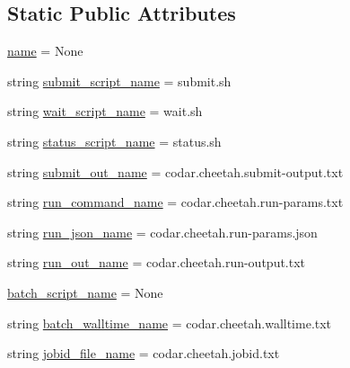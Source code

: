\subsection*{Static Public Attributes}
\begin{DoxyCompactItemize}
\item 
\hyperlink{classcodar_1_1cheetah_1_1launchers_1_1_launcher_aafbd307fbd2b8605a6e26bfda6e4cebe}{name} = None
\item 
string \hyperlink{classcodar_1_1cheetah_1_1launchers_1_1_launcher_ad49a82359a5f1fb129b34133e1068e92}{submit\+\_\+script\+\_\+name} = \textquotesingle{}submit.\+sh\textquotesingle{}
\item 
string \hyperlink{classcodar_1_1cheetah_1_1launchers_1_1_launcher_ab98a74ab3f9677e140eff974e94f6937}{wait\+\_\+script\+\_\+name} = \textquotesingle{}wait.\+sh\textquotesingle{}
\item 
string \hyperlink{classcodar_1_1cheetah_1_1launchers_1_1_launcher_ac3f6ab253b5fc5783e7b489da303a7d6}{status\+\_\+script\+\_\+name} = \textquotesingle{}status.\+sh\textquotesingle{}
\item 
string \hyperlink{classcodar_1_1cheetah_1_1launchers_1_1_launcher_aa4bbb4d58ed4af3a90c81b715bb32c90}{submit\+\_\+out\+\_\+name} = \textquotesingle{}codar.\+cheetah.\+submit-\/output.\+txt\textquotesingle{}
\item 
string \hyperlink{classcodar_1_1cheetah_1_1launchers_1_1_launcher_ad7f51985a666c18fa6b7944b8c09183e}{run\+\_\+command\+\_\+name} = \textquotesingle{}codar.\+cheetah.\+run-\/params.\+txt\textquotesingle{}
\item 
string \hyperlink{classcodar_1_1cheetah_1_1launchers_1_1_launcher_a400ec02171709c55f11c7efa54a50d1b}{run\+\_\+json\+\_\+name} = \textquotesingle{}codar.\+cheetah.\+run-\/params.\+json\textquotesingle{}
\item 
string \hyperlink{classcodar_1_1cheetah_1_1launchers_1_1_launcher_a177b178c57aa1f5862b5ce57a7f357d6}{run\+\_\+out\+\_\+name} = \textquotesingle{}codar.\+cheetah.\+run-\/output.\+txt\textquotesingle{}
\item 
\hyperlink{classcodar_1_1cheetah_1_1launchers_1_1_launcher_af55f3a888f545826d771f3679152da47}{batch\+\_\+script\+\_\+name} = None
\item 
string \hyperlink{classcodar_1_1cheetah_1_1launchers_1_1_launcher_abfcb19cb3d329c4ea0f362667f70df2f}{batch\+\_\+walltime\+\_\+name} = \textquotesingle{}codar.\+cheetah.\+walltime.\+txt\textquotesingle{}
\item 
string \hyperlink{classcodar_1_1cheetah_1_1launchers_1_1_launcher_a25b770312bca1ca9b0deefa1faf89c06}{jobid\+\_\+file\+\_\+name} = \textquotesingle{}codar.\+cheetah.\+jobid.\+txt\textquotesingle{}
\end{DoxyCompactItemize}


